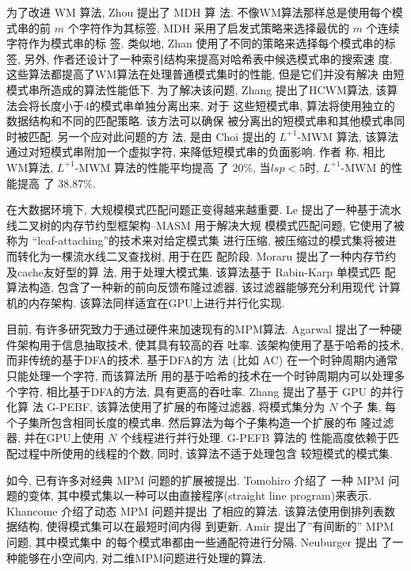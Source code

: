 \documentclass{ws-ijprai}
\begin{document}
为了改进 \textsf{WM} 算法, Zhou \cite{Zhou2007} 提出了 \textsf{MDH} 算
法. 不像WM算法那样总是使用每个模式串的前 $m$ 个字符作为其标签,
\textsf{MDH} 采用了启发式策略来选择最优的 $m$ 个连续字符作为模式串的标
签. 类似地, Zhan \cite{Zhan2014} 使用了不同的策略来选择每个模式串的标
签, 另外, 作者还设计了一种索引结构来提高对哈希表中候选模式串的搜索速
度. 这些算法都提高了WM算法在处理普通模式集时的性能, 但是它们并没有解决
由短模式串所造成的算法性能低下. 为了解决该问题, Zhang \cite{Zhang2009}
提出了\textsf{HCWM}算法, 该算法会将长度小于4的模式串单独分离出来, 对于
这些短模式串, 算法将使用独立的数据结构和不同的匹配策略. 该方法可以确保
被分离出的短模式串和其他模式串同时被匹配. 另一个应对此问题的方
法, 是由 Choi \cite{Choi2011} 提出的 \textsf{$L^{+1}$-MWM} 算法, 该算法
通过对短模式串附加一个虚拟字符, 来降低短模式串的负面影响. 作者
称, 相比WM算法, \textsf{$L^{+1}$-MWM} 算法的性能平均提高
了 $20\%$, 当$lsp < 5$时, \textsf{$L^{+1}$-MWM} 的性能提高
了 $38.87\%$.


在大数据环境下, 大规模模式匹配问题正变得越来越重要. Le \cite{Le2013}
提出了一种基于流水线二叉树的内存节约型框架构--\textsf{MASM} 用于解决大规
模模式匹配问题, 它使用了被称为 ``leaf-attaching''的技术来对给定模式集
进行压缩, 被压缩过的模式集将被进而转化为一棵流水线二叉查找树, 用于在匹
配阶段. Moraru \cite{Moraru2013} 提出了一种内存节约及cache友好型的算
法, 用于处理大模式集. 该算法基于 Rabin-Karp \cite{Karp1987} 单模式匹
配算法构造, 包含了一种新的前向反馈布隆过滤器, 该过滤器能够充分利用现代
计算机的内存架构. 该算法同样适宜在GPU上进行并行化实现.

目前, 有许多研究致力于通过硬件来加速现有的MPM算法. Agarwal
\cite{Agarwal2013} 提出了一种硬件架构用于信息抽取技术, 使其具有较高的吞
吐率. 该架构使用了基于哈希的技术, 而非传统的基于DFA的技术. 基于DFA的方
法 (比如 \textsf{AC}) 在一个时钟周期内通常只能处理一个字符, 而该算法所
用的基于哈希的技术在一个时钟周期内可以处理多个字符, 相比基于DFA的方法,
具有更高的吞吐率. Zhang \cite{Zhang2015} 提出了基于 GPU 的并行化算
法 \textsf{G-PEBF}, 该算法使用了扩展的布隆过滤器, 将模式集分为 $N$ 个子
集, 每个子集所包含相同长度的模式串. 然后算法为每个子集构造一个扩展的布
隆过滤器, 并在GPU上使用 $N$ 个线程进行并行处理. \textsf{G-PEFB} 算法的
性能高度依赖于匹配过程中所使用的线程的个数, 同时, 该算法不适于处理包含
较短模式的模式集.

如今, 已有许多对经典 MPM 问题的扩展被提出. Tomohiro \cite{I2015} 介绍了
一种 MPM 问题的变体, 其中模式集以一种可以由直接程序(straight line
program)来表示.  Khancome \cite{Khancome2013} 介绍了动态 MPM 问题并提出
了相应的算法. 该算法使用倒排列表数据结构, 使得模式集可以在最短时间内得
到更新. Amir \cite{Amir2015} 提出了''有间断的'' MPM 问题, 其中模式集中
的每个模式串都由一些通配符进行分隔. Neuburger \cite{Neuburger2012} 提出
了一种能够在小空间内, 对二维MPM问题进行处理的算法.
\end{document}
